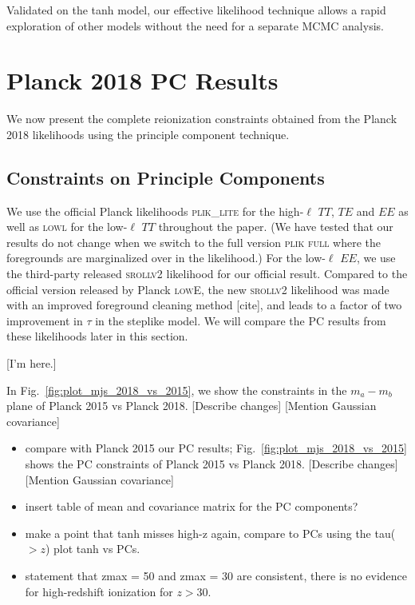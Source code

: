 \documentclass[prd,twocolumn,amsmath,amssymb,floatfix,superscriptaddress,nofootinbib]{revtex4-1}
\begin{document}
Validated on the tanh model, our effective likelihood technique allows a rapid exploration of other models without the need for
 a separate MCMC analysis.


\section{Planck 2018 PC Results}
\label{sec:results}

We now present the complete reionization constraints obtained from the Planck 2018 likelihoods using the principle component technique. 

\subsection{Constraints on Principle Components}

We use the official Planck likelihoods \textsc{plik\_lite} for the high-$\ell$ $TT$, $TE$ and $EE$ as well as \textsc{lowl} for the low-$\ell$ $TT$ throughout the paper. (We have tested that our results do not change when we switch to the full version \textsc{plik full} where the foregrounds are marginalized over in the likelihood.) For the low-$\ell$ $EE$, we use the third-party released \textsc{srollv2} likelihood for our official result. Compared to the official version released by Planck \textsc{lowE}, the new \textsc{srollv2} likelihood was made with an improved foreground cleaning method [cite], and leads to a factor of two improvement in $\tau$ in the steplike model. We will compare the PC results from these likelihoods later in this section.

[I'm here.]

In Fig.~\ref{fig:plot_mjs_2018_vs_2015}, we show the constraints in the $m_a-m_b$ plane of Planck 2015 vs Planck 2018. [Describe changes] [Mention Gaussian covariance]

\begin{itemize}
    \item compare with Planck 2015 our PC results; Fig.~\ref{fig:plot_mjs_2018_vs_2015} shows the PC constraints of Planck 2015 vs Planck 2018. [Describe changes] [Mention Gaussian covariance]
    \item insert table of mean and covariance matrix for the PC components?
    \item make a point that tanh misses high-z again, compare to PCs using the tau($>z$) plot tanh vs PCs.
    \item statement that zmax = 50 and zmax = 30 are consistent, there is no evidence for high-redshift ionization for $z>30$.\\
\end{itemize}
\end{document}
